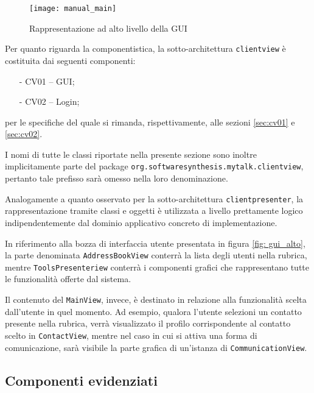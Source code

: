 \begin{figure}[h]
  \centering
  \texttt{[image: manual\_main]}
  \caption{Rappresentazione ad alto livello della GUI}\label{fig: gui_alto}
\end{figure}

Per quanto riguarda la componentistica, la sotto-architettura \texttt{clientview} è costituita dai seguenti componenti:
\begin{itemize}[noitemsep,nolistsep]
  \item[-] \textsf{CV01 -- GUI};
  \item[-] \textsf{CV02 -- Login};
\end{itemize}
per le specifiche del quale si rimanda, rispettivamente, alle sezioni \ref{sec:cv01} e \ref{sec:cv02}.

I nomi di tutte le classi riportate nella presente sezione sono inoltre implicitamente parte del package \texttt{org.softwaresynthesis.mytalk.clientview}, pertanto tale prefisso sarà omesso nella loro denominazione.

Analogamente a quanto osservato per la sotto-architettura \texttt{clientpresenter}, la rappresentazione tramite classi e oggetti è utilizzata a livello prettamente logico indipendentemente dal dominio applicativo concreto di implementazione.

In riferimento alla bozza di interfaccia utente presentata in figura \vref{fig: gui_alto}, la parte denominata \texttt{AddressBookView} conterrà la lista degli utenti nella rubrica, mentre \texttt{ToolsPresenteriew} conterrà i componenti grafici che rappresentano tutte le funzionalità offerte dal sistema. 

Il contenuto del \texttt{MainView}, invece, è destinato in relazione alla funzionalità scelta dall'utente in quel momento. Ad esempio, qualora l'utente selezioni un contatto presente nella rubrica, verrà visualizzato il profilo corrispondente al contatto scelto in \texttt{ContactView}, mentre nel caso in cui si attiva una forma di comunicazione, sarà visibile la parte grafica di un'istanza di \texttt{CommunicationView}.

\subsection{Componenti evidenziati}

